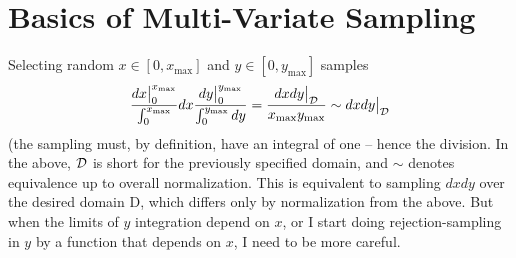 \documentclass[11pt]{article}
\newcommand{\be}{\begin{equation}}
\newcommand{\ee}{\end{equation}}
\newcommand{\bea}{\begin{eqnarray}}
\newcommand{\eea}{\end{eqnarray}}
\begin{document}
%

\section{Basics of Multi-Variate Sampling}
Selecting random $x\in [0,x_{{\max}}]$ and $y\in [0,y_{{\max}}]$ samples
\be
\frac{dx \big|_0^{x_{\max}}}{\int_0^{x_{\max}}}dx \frac{dy \big|_0^{y_{\max}}}{\int_0^{y_{\max}} dy}  = \frac{dx dy\big|_{\cal D}}{x_{{\max}} y_{\max}} \sim dx dy \big|_{\cal D}
\ee
(the sampling must, by definition, have an integral of one -- hence the division.  In the above, ${\cal D}$ is short for the previously specified domain, and $\sim$ denotes equivalence up to overall normalization. This is equivalent to sampling $dx dy$ over the desired domain {\cal D}, which differs only by normalization from the above.  But when the limits of $y$ integration depend on $x$, or I start doing rejection-sampling in $y$ by a function that depends on $x$, I need to be more careful.
\end{document}
